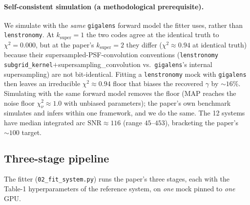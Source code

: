 \documentclass[11pt,letterpaper]{article}
\newcommand{\chisq}{\ensuremath{\chi^2_\nu}}
\begin{document}
\paragraph{Self-consistent simulation (a methodological prerequisite).}
We simulate with the \emph{same} \texttt{gigalens} forward model the fitter
uses, rather than \texttt{lenstronomy}. At $k_{\mathrm{super}}=1$ the two
codes agree at the identical truth to $\chi^2=0.000$, but at the paper's
$k_{\mathrm{super}}=2$ they differ ($\chi^2\approx0.94$ at identical truth)
because their supersampled-PSF-convolution conventions
(\texttt{lenstronomy} \texttt{subgrid\_kernel}$+$supersampling\_convolution
vs.\ \texttt{gigalens}'s internal supersampling) are not bit-identical.
Fitting a \texttt{lenstronomy} mock with \texttt{gigalens} then leaves an
irreducible $\chi^2\!\approx\!0.94$ floor that biases the recovered
$\gamma$ by ${\sim}16\%$. Simulating with the same forward model removes the
floor (MAP reaches the noise floor $\chisq\approx1.0$ with unbiased
parameters); the paper's own benchmark simulates and infers within one
framework, and we do the same. The 12 systems have median integrated arc
$\mathrm{SNR}\approx116$ (range $45$--$453$), bracketing the paper's
${\sim}100$ target.

\subsection{Three-stage pipeline}

The fitter (\texttt{02\_fit\_system.py}) runs the paper's three stages, each
with the Table-1 hyperparameters of the reference system, on \emph{one} mock
pinned to \emph{one} GPU.
\end{document}
